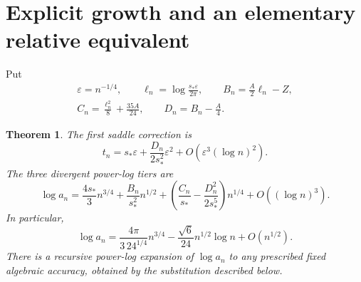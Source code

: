 \documentclass[11pt]{article}
\newtheorem{theorem}{Theorem}[section]
\theoremstyle{remark}\newtheorem{remark}[theorem]{Remark}
\newcommand{\as}{s_*}\newcommand{\eps}{\varepsilon}\newcommand{\poc}[2]{(#1;#2)_\infty}
\begin{document}
\section{Explicit growth and an elementary relative equivalent}\label{stp:len:sec:explicit}
Put
\begin{equation}\label{stp:len:eq:nnotation}
\begin{gathered}
 \eps=n^{-1/4},\qquad \ell_n=\log\frac{\as\eps}{2\pi},\qquad
 B_n=\frac A2\ell_n-Z,\\
 C_n=\frac{\ell_n^2}{8}+\frac{35A}{24},\qquad D_n=B_n-\frac A4.
\end{gathered}
\end{equation}

\begin{theorem}\label{stp:len:thm:tiers}
The first saddle correction is
\begin{equation}\label{stp:len:eq:saddlecorrection}
 t_n=\as\eps+\frac{D_n}{2\as^2}\eps^2
       +O(\eps^3(\log n)^2).
\end{equation}
The three divergent power-log tiers are
\begin{equation}\label{stp:len:eq:tiers}
 \log a_n=\frac{4\as}{3}n^{3/4}
 +\frac{B_n}{\as^2}n^{1/2}
 +\left(\frac{C_n}{\as}-\frac{D_n^2}{2\as^5}\right)n^{1/4}
 +O((\log n)^3).
\end{equation}
In particular,
\begin{equation}\label{stp:len:eq:leadingtwo}
 \log a_n=\frac{4\pi}{3\,24^{1/4}}n^{3/4}
           -\frac{\sqrt6}{24}n^{1/2}\log n+O(n^{1/2}).
\end{equation}
There is a recursive power-log expansion of $\log a_n$ to any prescribed fixed algebraic accuracy, obtained by the substitution described below.
\end{theorem}
\end{document}
